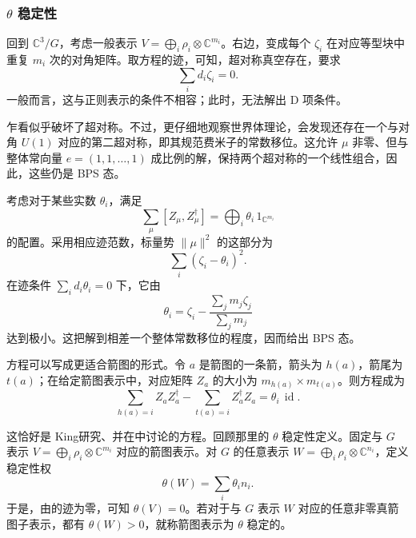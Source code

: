 \subsubsection{\texorpdfstring{$\theta$}{theta} 稳定性}\label{sec:5.4.5.5}

回到 $\mathbb{C}^3/G$，考虑一般表示 $V=\bigoplus_i\rho_i\otimes\mathbb{C}^{m_i}$。右边，变成每个 $\zeta_i$ 在对应等型块中重复 $m_i$ 次的对角矩阵。取方程的迹，可知，超对称真空存在，要求
\begin{equation}\label{eq:5.115}
\sum_i d_i\zeta_i=0.
\end{equation}
一般而言，这与正则表示的条件不相容；此时，无法解出 D 项条件。

乍看似乎破坏了超对称。不过，更仔细地观察世界体理论，会发现还存在一个与对角 $U(1)$ 对应的第二超对称，即其规范费米子的常数移位。这允许 $\mu$ 非零、但与整体常向量 $e=(1,1,\ldots,1)$ 成比例的解，保持两个超对称的一个线性组合，因此，这些仍是 BPS 态。

考虑对于某些实数 $\theta_i$，满足
\begin{equation}\label{eq:5.116}
\sum_\mu[Z_\mu,Z_\mu^\dagger]
=\bigoplus_i\theta_i\,1_{\mathbb{C}^{m_i}}
\end{equation}
的配置。采用相应迹范数，标量势 $\|\mu\|^2$ 的这部分为
\begin{equation}\label{eq:5.117}
\sum_i(\zeta_i-\theta_i)^2.
\end{equation}
在迹条件 $\sum_i d_i\theta_i=0$ 下，它由
\begin{equation}\label{eq:5.118}
\theta_i=\zeta_i-
\frac{\sum_jm_j\zeta_j}{\sum_jm_j}
\end{equation}
达到极小。这把解到相差一个整体常数移位的程度，因而给出 BPS 态。

方程可以写成更适合箭图的形式。令 $a$ 是箭图的一条箭，箭头为 $h(a)$，箭尾为 $t(a)$；在给定箭图表示中，对应矩阵 $Z_a$ 的大小为 $m_{h(a)}\times m_{t(a)}$。则方程成为
\begin{equation}\label{eq:5.119}
\sum_{h(a)=i}Z_aZ_a^\dagger
-\sum_{t(a)=i}Z_a^\dagger Z_a=\theta_i\,\operatorname{id}.
\end{equation}

这恰好是 King研究、并在中讨论的方程。回顾那里的 $\theta$ 稳定性定义。固定与 $G$ 表示 $V=\bigoplus_i\rho_i\otimes\mathbb{C}^{m_i}$ 对应的箭图表示。对 $G$ 的任意表示 $W=\bigoplus_i\rho_i\otimes\mathbb{C}^{n_i}$，定义稳定性权
\begin{equation}\label{eq:5.120}
\theta(W)=\sum_i\theta_i n_i.
\end{equation}
于是，由的迹为零，可知 $\theta(V)=0$。若对于与 $G$ 表示 $W$ 对应的任意非零真箭图子表示，都有 $\theta(W)>0$，就称箭图表示为 $\theta$ 稳定的。

